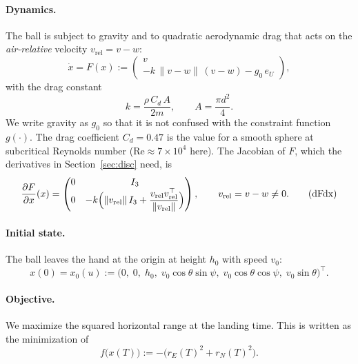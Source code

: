 \documentclass[11pt]{article}
\newcommand{\ve}{e_{U}}
\begin{document}
\paragraph{Dynamics.} The ball is subject to gravity and to quadratic aerodynamic drag that acts on
the \emph{air-relative} velocity $v_{\mathrm{rel}} = v - w$:
\begin{equation}
  \dot x = F(x) :=
  \begin{pmatrix} v \\ -k\,\|v-w\|\,(v-w) - g_0\,\ve \end{pmatrix},
  \tag{dyn}\label{eq:dyn}
\end{equation}
with the drag constant
\begin{equation}
  k = \frac{\rho\, C_d\, A}{2m},\qquad A = \frac{\pi d^2}{4}.
  \tag{k}\label{eq:k}
\end{equation}
We write gravity as $g_0$ so that it is not confused with the constraint function $g(\cdot)$.
The drag coefficient $C_d = 0.47$ is the value for a smooth sphere at subcritical Reynolds number
($\mathrm{Re} \approx 7\times10^4$ here). The Jacobian of $F$, which the derivatives in
Section~\ref{sec:disc} need, is
\begin{equation}
  \frac{\partial F}{\partial x}(x) =
  \begin{pmatrix} 0 & I_3 \\ 0 & -k\Bigl(\|v_{\mathrm{rel}}\|\, I_3
      + \dfrac{v_{\mathrm{rel}}v_{\mathrm{rel}}^\top}{\|v_{\mathrm{rel}}\|}\Bigr)\end{pmatrix},
  \qquad v_{\mathrm{rel}} = v - w \neq 0.
  \tag{dFdx}\label{eq:dFdx}
\end{equation}

\paragraph{Initial state.} The ball leaves the hand at the origin at height $h_0$ with speed $v_0$:
\begin{equation}
  x(0) = x_0(u) :=
  \bigl(0,\; 0,\; h_0,\; v_0\cos\theta\sin\psi,\; v_0\cos\theta\cos\psi,\; v_0\sin\theta\bigr)^\top.
  \tag{x0}\label{eq:x0}
\end{equation}

\paragraph{Objective.} We maximize the squared horizontal range at the landing time. This is
written as the minimization of
\[
  f\bigl(x(T)\bigr) := -\bigl(r_E(T)^2 + r_N(T)^2\bigr).
\]
\end{document}
